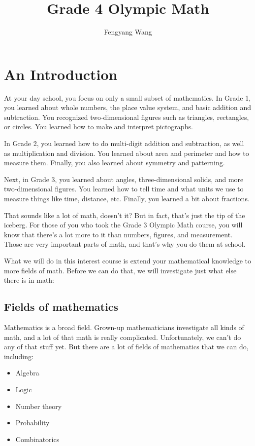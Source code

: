 \documentclass[a4paper,10pt]{report}
\title{Grade 4 Olympic Math}
\author{Fengyang Wang}
\begin{document}
\maketitle

\chapter{An Introduction}

At your day school, you focus on only a small subset of mathematics. In Grade 1,
you learned about whole numbers, the place value system, and basic addition and
subtraction. You recognized two-dimensional figures such as triangles,
rectangles, or circles. You learned how to make and interpret pictographs.

In Grade 2, you learned how to do multi-digit addition and subtraction, as well
as multiplication and division. You learned about area and perimeter and how to
measure them. Finally, you also learned about symmetry and patterning.

Next, in Grade 3, you learned about angles, three-dimensional solids, and more
two-dimensional figures. You learned how to tell time and what units we use to
measure things like time, distance, etc. Finally, you learned a bit about
fractions.

That sounds like a lot of math, doesn't it? But in fact, that's just the tip of
the iceberg. For those of you who took the Grade 3 Olympic Math course, you will
know that there's a lot more to it than numbers, figures, and measurement. Those
are very important parts of math, and that's why you do them at school.

What we will do in this interest course is extend your mathematical knowledge to
more fields of math. Before we can do that, we will investigate just what else
there is in math:

\section{Fields of mathematics}

Mathematics is a broad field. Grown-up mathematicians investigate all kinds of
math, and a lot of that math is really complicated. Unfortunately, we can't do
any of that stuff yet. But there are a lot of fields of mathematics that we can
do, including:

\begin{itemize}
 \item Algebra
 \item Logic
 \item Number theory
 \item Probability
 \item Combinatorics
\end{itemize}
\end{document}
